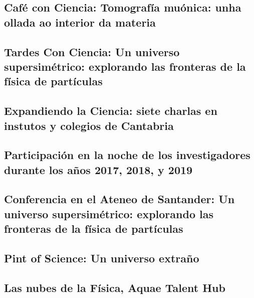\documentclass[a4paper, 11pt, twoside, openright]{report}
\begin{document}
\subsection{Café con Ciencia: Tomografía muónica: unha ollada ao interior da materia}


\subsection{Tardes Con Ciencia: Un universo supersimétrico: explorando las fronteras de la física de partículas}


\subsection{Expandiendo la Ciencia: siete charlas en instutos y colegios de Cantabria}


\subsection{Participación en la noche de los investigadores durante los años 2017, 2018, y 2019}


\subsection{Conferencia en el Ateneo de Santander: Un universo supersimétrico: explorando las fronteras de la física de partículas}


\subsection{Pint of Science: Un universo extraño}


\subsection{Las nubes de la Física, Aquae Talent Hub}

\end{document}
